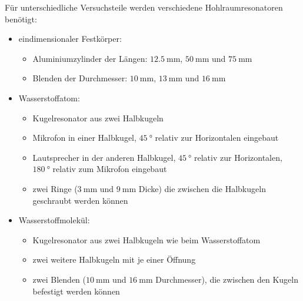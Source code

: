 \newpage
Für unterschiedliche Versuchsteile werden verschiedene Hohlraumresonatoren benötigt:
\begin{itemize}
    \item eindimensionaler Festkörper:
        \begin{itemize}
            \item Aluminiumzylinder der Längen: $\SI{12,5}{\milli\meter}$, $\SI{50}{\milli\meter}$ und $\SI{75}{\milli\meter}$
            \item Blenden der Durchmesser: $\SI{10}{\milli\meter}$, $\SI{13}{\milli\meter}$ und $\SI{16}{\milli\meter}$
        \end{itemize}
    \item Wasserstoffatom:
        \begin{itemize}
            \item Kugelresonator aus zwei Halbkugeln
            \item Mikrofon in einer Halbkugel, $\SI{45}{\degree}$ relativ zur Horizontalen eingebaut
            \item Lautsprecher in der anderen Halbkugel, $\SI{45}{\degree}$ relativ zur Horizontalen, $\SI{180}{\degree}$ relativ zum Mikrofon eingebaut
            \item zwei Ringe ($\SI{3}{\milli\meter}$ und $\SI{9}{\milli\meter}$ Dicke) die zwischen die Halbkugeln geschraubt werden können
        \end{itemize}
    \item Wasserstoffmolekül:
        \begin{itemize}
            \item Kugelresonator aus zwei Halbkugeln wie beim Wasserstoffatom
            \item zwei weitere Halbkugeln mit je einer Öffnung
            \item zwei Blenden ($\SI{10}{\milli\meter}$ und $\SI{16}{\milli\meter}$ Durchmesser), die zwischen den Kugeln befestigt werden können
        \end{itemize}
\end{itemize}

